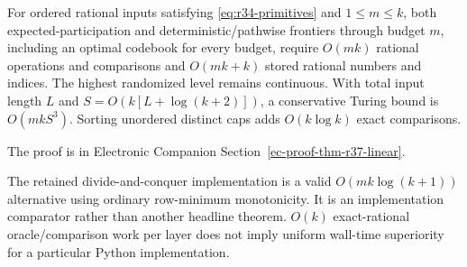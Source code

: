 \begin{theorem}\label{thm:r37-linear}
For ordered rational inputs satisfying \eqref{eq:r34-primitives} and $1\leq m\leq k$, both expected-participation and deterministic/pathwise frontiers through budget $m$, including an optimal codebook for every budget, require $O(mk)$ rational operations and comparisons and $O(mk+k)$ stored rational numbers and indices. The highest randomized level remains continuous. With total input length $L$ and $S=O(k[L+\log(k+2)])$, a conservative Turing bound is $O(mkS^3)$. Sorting unordered distinct caps adds $O(k\log k)$ exact comparisons.
\end{theorem}
\noindent The proof is in Electronic Companion Section~\ref{ec-proof-thm-r37-linear}.


The retained divide-and-conquer implementation is a valid $O(mk\log(k+1))$ alternative using ordinary row-minimum monotonicity. It is an implementation comparator rather than another headline theorem. $O(k)$ exact-rational oracle/comparison work per layer does not imply uniform wall-time superiority for a particular Python implementation.
